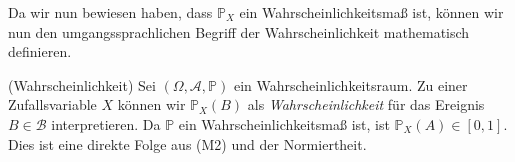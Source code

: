 \vspace{\baselineskip}

Da wir nun bewiesen haben, dass $\mathbb{P}_X$ ein Wahrscheinlichkeitsmaß ist, können wir nun den umgangssprachlichen Begriff der \glqq Wahrscheinlichkeit\grqq{} mathematisch definieren.

\begin{Bemerkung}{(Wahrscheinlichkeit)}
Sei $(\Omega, \mathscr{A}, \mathbb{P})$ ein Wahrscheinlichkeitsraum. Zu einer Zufallsvariable $X$ können wir $\mathbb{P}_X(B)$ als \textit{Wahrscheinlichkeit} für das Ereignis $B \in \mathscr{B}$ interpretieren. Da $\mathbb{P}$ ein Wahrscheinlichkeitsmaß ist, ist $\mathbb{P}_X(A) \in [0, 1]$. Dies ist eine direkte Folge aus (M2) und der Normiertheit.
\end{Bemerkung}